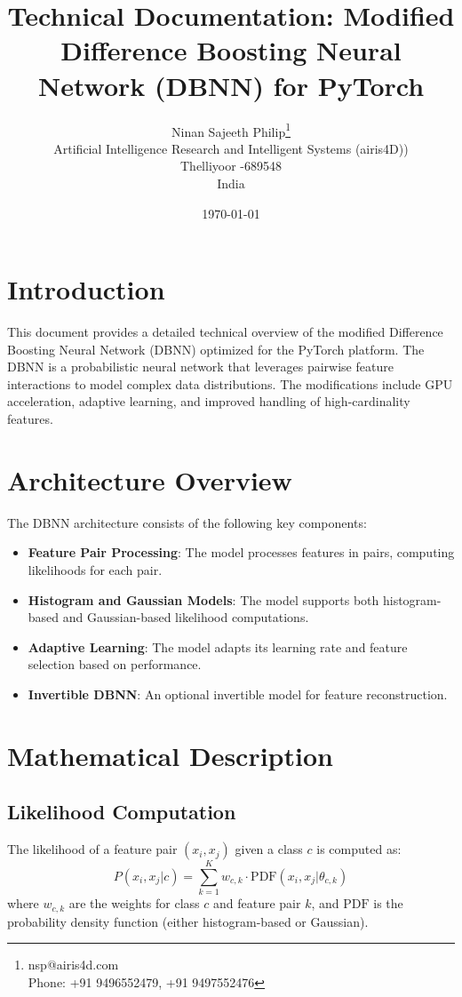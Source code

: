 \documentclass{article}
\title{Technical Documentation: Modified Difference Boosting Neural Network (DBNN) for PyTorch}
\author{Ninan Sajeeth Philip\footnote{nsp@airis4d.com\\ Phone: +91 9496552479, +91 9497552476}\\ Artificial Intelligence Research and Intelligent Systems (airis4D))\\ Thelliyoor -689548\\ India}
\date{\today}
\begin{document}
\maketitle

\tableofcontents

\section{Introduction}
This document provides a detailed technical overview of the modified Difference Boosting Neural Network (DBNN) optimized for the PyTorch platform. The DBNN is a probabilistic neural network that leverages pairwise feature interactions to model complex data distributions. The modifications include GPU acceleration, adaptive learning, and improved handling of high-cardinality features.

\section{Architecture Overview}
The DBNN architecture consists of the following key components:
\begin{itemize}
    \item \textbf{Feature Pair Processing}: The model processes features in pairs, computing likelihoods for each pair.
    \item \textbf{Histogram and Gaussian Models}: The model supports both histogram-based and Gaussian-based likelihood computations.
    \item \textbf{Adaptive Learning}: The model adapts its learning rate and feature selection based on performance.
    \item \textbf{Invertible DBNN}: An optional invertible model for feature reconstruction.
\end{itemize}

\section{Mathematical Description}
\subsection{Likelihood Computation}
The likelihood of a feature pair $(x_i, x_j)$ given a class $c$ is computed as:
\[
P(x_i, x_j | c) = \sum_{k=1}^{K} w_{c,k} \cdot \text{PDF}(x_i, x_j | \theta_{c,k})
\]
where $w_{c,k}$ are the weights for class $c$ and feature pair $k$, and $\text{PDF}$ is the probability density function (either histogram-based or Gaussian).
\end{document}
